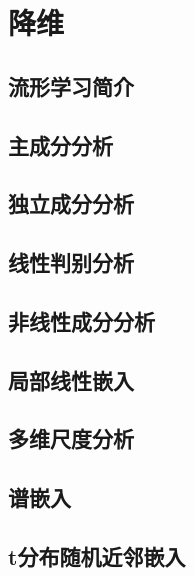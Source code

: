 \chapter{降维} %
\label{cha:降维}
\section{流形学习简介} %
\label{sec:流形学习简介}

\section{主成分分析} %
\label{sec:主成分分析}

\section{独立成分分析} %
\label{sec:独立成分分析}

\section{线性判别分析} %
\label{sec:线性判别分析}

\section{非线性成分分析} %
\label{sec:非线性成分分析}

\section{局部线性嵌入} %
\label{sec:局部线性嵌入}

\section{多维尺度分析} %
\label{sec:多维尺度分析}

\section{谱嵌入} %
\label{sec:谱嵌入}

\section{t分布随机近邻嵌入} %
\label{sec:t分布随机近邻嵌入}




